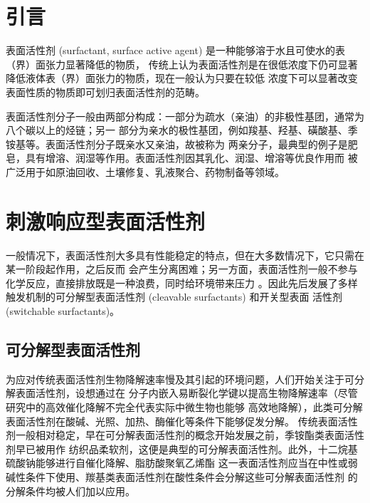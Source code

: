 \documentclass[bachelor,fandolfonts,replaceperiod]{jnuthesis}
\begin{document}
    \section{引言}
    表面活性剂 (surfactant, surface active agent) 是一种能够溶于水且可使水的表（界）面张力显著降低的物质，
    传统上认为表面活性剂是在很低浓度下仍可显著降低液体表（界）面张力的物质，现在一般认为只要在较低
    浓度下可以显著改变表面性质的物质即可划归表面活性剂的范畴。
    
    表面活性剂分子一般由两部分构成：一部分为疏水（亲油）的非极性基团，通常为八个碳以上的烃链；另一
    部分为亲水的极性基团，例如羧基、羟基、磺酸基、季铵基等。表面活性剂分子既亲水又亲油，故被称为
    两亲分子，最典型的例子是肥皂，具有增溶、润湿等作用。表面活性剂因其乳化、润湿、增溶等优良作用而
    被广泛用于如原油回收、土壤修复、乳液聚合、药物制备等领域\cite{秦勇2009}。
    
    \section{刺激响应型表面活性剂}
    一般情况下，表面活性剂大多具有性能稳定的特点，但在大多数情况下，它只需在某一阶段起作用，之后反而
    会产生分离困难；另一方面，表面活性剂一般不参与化学反应，直接排放既是一种浪费，同时给环境带来压力
    \cite{秦勇2009}。因此先后发展了多样触发机制的可分解型表面活性剂 (cleavable surfactants) 和开关型表面
    活性剂 (switchable surfactants)。
    
    \subsection{可分解型表面活性剂}
    为应对传统表面活性剂生物降解速率慢及其引起的环境问题，人们开始关注于可分解表面活性剂，设想通过在
    分子内嵌入易断裂化学键以提高生物降解速率（尽管研究中的高效催化降解不完全代表实际中微生物也能够
    高效地降解）\cite{tehrani2007}，此类可分解表面活性剂在酸碱、光照、加热、酶催化等条件下能够促发分解\cite{hellberg2000}。
    传统表面活性剂一般相对稳定，早在可分解表面活性剂的概念开始发展之前，季铵酯类表面活性剂早已被用作
    纺织品柔软剂，这便是典型的可分解表面活性剂。此外，十二烷基硫酸钠能够进行自催化降解、脂肪酸聚氧乙烯酯
    这一表面活性剂应当在中性或弱碱性条件下使用、羰基类表面活性剂在酸性条件会分解这些可分解表面活性剂
    的分解条件均被人们加以应用\cite{tehrani2007}。
    
\end{document}
